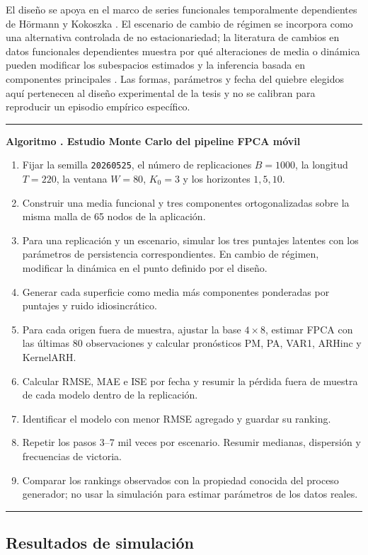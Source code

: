 \documentclass[a4paper,11pt]{article}
\newcounter{algoritmotesis}
\newenvironment{algoritmotesis}[1]{%
  \refstepcounter{algoritmotesis}%
  \par\medskip
  \noindent\begin{minipage}{\linewidth}
  \hrule\vspace{0.6em}
  \textbf{Algoritmo \thealgoritmotesis. #1}
  \begin{enumerate}
}{%
  \end{enumerate}
  \vspace{0.2em}\hrule
  \end{minipage}
  \par\medskip
}
\begin{document}
El diseño se apoya en el marco de series funcionales temporalmente dependientes de Hörmann y Kokoszka \cite{HormannKokoszka2010}. El escenario de cambio de régimen se incorpora como una alternativa controlada de no estacionariedad; la literatura de cambios en datos funcionales dependientes muestra por qué alteraciones de media o dinámica pueden modificar los subespacios estimados y la inferencia basada en componentes principales \cite{AstonKirch2012}. Las formas, parámetros y fecha del quiebre elegidos aquí pertenecen al diseño experimental de la tesis y no se calibran para reproducir un episodio empírico específico.

\begin{algoritmotesis}{Estudio Monte Carlo del pipeline FPCA móvil}
  \item Fijar la semilla \texttt{20260525}, el número de replicaciones \(B=1000\), la longitud \(T=220\), la ventana \(W=80\), \(K_0=3\) y los horizontes \(1,5,10\).
  \item Construir una media funcional y tres componentes ortogonalizadas sobre la misma malla de 65 nodos de la aplicación.
  \item Para una replicación y un escenario, simular los tres puntajes latentes con los parámetros de persistencia correspondientes. En cambio de régimen, modificar la dinámica en el punto definido por el diseño.
  \item Generar cada superficie como media más componentes ponderadas por puntajes y ruido idiosincrático.
  \item Para cada origen fuera de muestra, ajustar la base \(4\times8\), estimar FPCA con las últimas 80 observaciones y calcular pronósticos PM, PA, VAR1, ARHinc y KernelARH.
  \item Calcular RMSE, MAE e ISE por fecha y resumir la pérdida fuera de muestra de cada modelo dentro de la replicación.
  \item Identificar el modelo con menor RMSE agregado y guardar su ranking.
  \item Repetir los pasos 3--7 mil veces por escenario. Resumir medianas, dispersión y frecuencias de victoria.
  \item Comparar los rankings observados con la propiedad conocida del proceso generador; no usar la simulación para estimar parámetros de los datos reales.
\end{algoritmotesis}

\subsection{Resultados de simulación}
\end{document}
